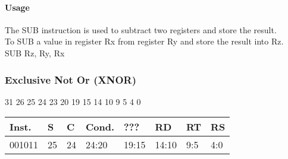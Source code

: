 \documentclass[12pt]{article}
\begin{document}
    \paragraph{Usage}
    \begin{flushleft}
    The SUB instruction is used to subtract two registers and store the result.\\
    \vspace{1em}
    To SUB a value in register Rx from register Ry and store the result into Rz.\\
    \vspace{1em}
    SUB Rz, Ry, Rx
    \end{flushleft}
   
   




    \newpage
    \subsubsection{Exclusive Not Or (XNOR)}
    
    \hspace{1.6cm}31 \hspace{1.2cm}26 \hspace{.075cm}25 \hspace{.15cm}24 \hspace{.075cm}23 \hspace{.875cm}20 \hspace{.04cm}19 \hspace{.8cm}15 \hspace{.04cm}14 \hspace{.8cm}10 \hspace{.04cm}9 \hspace{1.15cm}5 \hspace{.04cm}4 \hspace{1.25cm}0
    \vspace{-.25cm}
    \begin{center}
        \begin{tabular}{ |p{1.8cm}|p{.3cm}|p{.3cm}|p{1.5cm}|p{1.5cm}|p{1.5cm}|p{1.5cm}|p{1.5cm}| }
            \hline
            \textbf{Inst.} & \textbf{S}& \textbf{C} & \textbf{Cond.} & ??? & \textbf{RD} & \textbf{RT} & \textbf{RS}\\
            \hline
            001011& 25 & 24 & 24:20 & 19:15 & 14:10 & 9:5 & 4:0\\
            \hline
        \end{tabular}
    \end{center}
    
\end{document}
